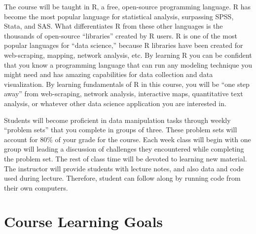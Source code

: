 \documentclass[11pt,]{article}
\begin{document}
The course will be taught in R, a free, open-source programming
language. R has become the most popular language for statistical
analysis, surpassing SPSS, Stata, and SAS. What differentiates R from
these other languages is the thousands of open-source ``libraries''
created by R users. R is one of the most popular languages for ``data
science,'' because R libraries have been created for web-scraping,
mapping, network analysis, etc. By learning R you can be confident that
you know a programming language that can run any modeling technique you
might need and has amazing capabilities for data collection and data
visualization. By learning fundamentals of R in this course, you will be
``one step away'' from web-scraping, network analysis, interactive maps,
quantitative text analysis, or whatever other data science application
you are interested in.

Students will become proficient in data manipulation tasks through
weekly ``problem sets'' that you complete in groups of three. These
problem sets will account for 80\% of your grade for the course. Each
week class will begin with one group will leading a discussion of
challenges they encountered while completing the problem set. The rest
of class time will be devoted to learning new material. The instructor
will provide students with lecture notes, and also data and code used
during lecture. Therefore, student can follow along by running code from
their own computers.

\section{Course Learning Goals}\label{course-learning-goals}
\end{document}
